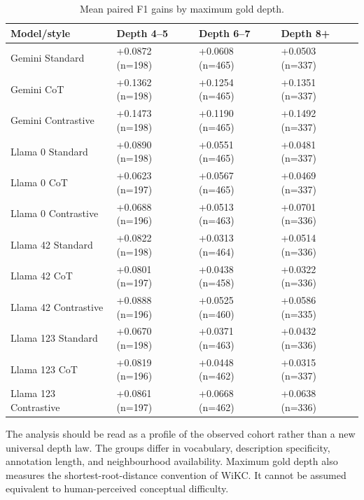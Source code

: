 \begingroup
\begin{table}[!htbp]
\setlength{\tabcolsep}{3pt}
\renewcommand{\arraystretch}{1.18}
\fontsize{8.5}{10.5}\selectfont
\renewcommand{\thetable}{7.9}
\caption{Mean paired F1 gains by maximum gold depth.}\label{table:7.9}
\begin{tabular}{>{\raggedright\arraybackslash}p{}>{\raggedright\arraybackslash}p{}>{\raggedright\arraybackslash}p{}>{\raggedright\arraybackslash}p{}}
\toprule
\textbf{Model/style} & \textbf{Depth 4–5} & \textbf{Depth 6–7} & \textbf{Depth 8+} \\
\midrule
Gemini Standard & +0.0872 (n=198) & +0.0608 (n=465) & +0.0503 (n=337) \\
Gemini CoT & +0.1362 (n=198) & +0.1254 (n=465) & +0.1351 (n=337) \\
Gemini Contrastive & +0.1473 (n=198) & +0.1190 (n=465) & +0.1492 (n=337) \\
Llama 0 Standard & +0.0890 (n=198) & +0.0551 (n=465) & +0.0481 (n=337) \\
Llama 0 CoT & +0.0623 (n=197) & +0.0567 (n=465) & +0.0469 (n=337) \\
Llama 0 Contrastive & +0.0688 (n=196) & +0.0513 (n=463) & +0.0701 (n=336) \\
Llama 42 Standard & +0.0822 (n=198) & +0.0313 (n=464) & +0.0514 (n=336) \\
Llama 42 CoT & +0.0801 (n=197) & +0.0438 (n=458) & +0.0322 (n=336) \\
Llama 42 Contrastive & +0.0888 (n=196) & +0.0525 (n=460) & +0.0586 (n=335) \\
Llama 123 Standard & +0.0670 (n=198) & +0.0371 (n=463) & +0.0432 (n=336) \\
Llama 123 CoT & +0.0819 (n=196) & +0.0448 (n=462) & +0.0315 (n=337) \\
Llama 123 Contrastive & +0.0861 (n=197) & +0.0668 (n=462) & +0.0638 (n=336) \\
\bottomrule
\end{tabular}
\end{table}
\endgroup


The analysis should be read as a profile of the observed cohort rather than a new universal depth law. The groups differ in vocabulary, description specificity, annotation length, and neighbourhood availability. Maximum gold depth also measures the shortest-root-distance convention of WiKC. It cannot be assumed equivalent to human-perceived conceptual difficulty.


